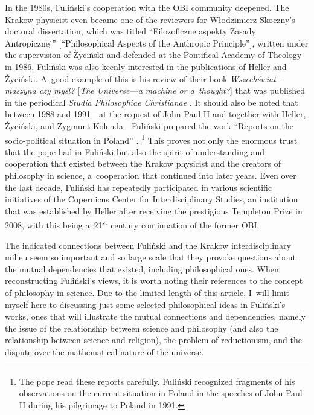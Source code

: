 In the 1980s, Fuliński's cooperation with the OBI community deepened. The Krakow physicist even became one of the reviewers for Włodzimierz Skoczny's doctoral dissertation, which was titled ``Filozoficzne aspekty Zasady Antropicznej'' [``Philosophical Aspects of the Anthropic Principle''], written under the supervision of Życiński and defended at the Pontifical Academy of Theology in 1986. Fuliński was also keenly interested in the publications of Heller and Życiński. A~good example of this is his review of their book \textit{Wszechświat---maszyna czy myśl?} [\textit{The Universe---a machine or a~thought?}] that was published in the periodical \textit{Studia Philosophiae Christianae} 
\parencite[][]{fulinski_maszyna_1989}. %
 It should also be noted that between 1988 and 1991---at the request of John Paul II and together with Heller, Życiński, and Zygmunt Kolenda---Fuliński prepared the work ``Reports on the socio-political situation in Poland'' 
\parencite[][]{heller_jan_2020}.%
\footnote{The pope read these reports carefully. Fuliński recognized fragments of his observations on the current situation in Poland in the speeches of John Paul II during his pilgrimage to Poland in 1991.} This proves not only the enormous trust that the pope had in Fuliński but also the spirit of understanding and cooperation that existed between the Krakow physicist and the creators of philosophy in science, a~cooperation that continued into later years. Even over the last decade, Fuliński has repeatedly participated in various scientific initiatives of the Copernicus Center for Interdisciplinary Studies, an institution that was established by Heller after receiving the prestigious Templeton Prize in 2008, with this being a~21\textsuperscript{st} century continuation of the former OBI.



The indicated connections between Fuliński and the Krakow interdisciplinary milieu seem so important and so large scale that they provoke questions about the mutual dependencies that existed, including philosophical ones. When reconstructing Fuliński's views, it is worth noting their references to the concept of philosophy in science. Due to the limited length of this article, I~will limit myself here to discussing just some selected philosophical ideas in Fuliński's works, ones that will illustrate the mutual connections and dependencies, namely the issue of the relationship between science and philosophy (and also the relationship between science and religion), the problem of reductionism, and the dispute over the mathematical nature of the universe.



